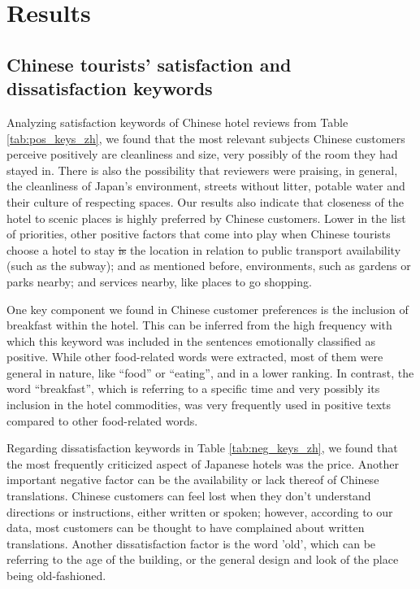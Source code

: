 \documentclass[review]{elsarticle}
\providecommand{\DIFadd}[1]{{\protect\color{blue}\uwave{#1}}} %
\providecommand{\DIFdel}[1]{{\protect\color{red}\sout{#1}}}                      %
\providecommand{\DIFaddbegin}{} %
\providecommand{\DIFaddend}{} %
\providecommand{\DIFdelbegin}{} %
\providecommand{\DIFdelend}{} %
\newcommand{\DIFscaledelfig}{0.5}
\newlength{\DIFdelgraphicswidth} %
\newlength{\DIFdelgraphicsheight} %
\newcommand{\DIFaddincludegraphics}[2][]{{\color{blue}\fbox{\DIFOincludegraphics[#1]{#2}}}} %
\newcommand{\DIFdelincludegraphics}[2][]{%
\sbox{\DIFdelgraphicsbox}{\DIFOincludegraphics[#1]{#2}}%
\settoboxwidth{\DIFdelgraphicswidth}{\DIFdelgraphicsbox} %
\settoboxtotalheight{\DIFdelgraphicsheight}{\DIFdelgraphicsbox} %
\scalebox{\DIFscaledelfig}{%
\parbox[b]{\DIFdelgraphicswidth}{\usebox{\DIFdelgraphicsbox}\\[-\baselineskip] \rule{\DIFdelgraphicswidth}{0em}}\llap{\resizebox{\DIFdelgraphicswidth}{\DIFdelgraphicsheight}{%
\setlength{\unitlength}{\DIFdelgraphicswidth}%
\begin{picture}(1,1)%
\thicklines\linethickness{2pt} %
{\color[rgb]{1,0,0}\put(0,0){\framebox(1,1){}}}%
{\color[rgb]{1,0,0}\put(0,0){\line( 1,1){1}}}%
{\color[rgb]{1,0,0}\put(0,1){\line(1,-1){1}}}%
\end{picture}%
}\hspace*{3pt}}} %
} %
\DeclareRobustCommand{\DIFaddbegin}{\DIFOaddbegin \let\includegraphics\DIFaddincludegraphics} %
\DeclareRobustCommand{\DIFaddend}{\DIFOaddend \let\includegraphics\DIFOincludegraphics} %
\DeclareRobustCommand{\DIFdelbegin}{\DIFOdelbegin \let\includegraphics\DIFdelincludegraphics} %
\DeclareRobustCommand{\DIFdelend}{\DIFOaddend \let\includegraphics\DIFOincludegraphics} %
\begin{document}
\section{Results}\label{results}

\subsection{Chinese tourists' satisfaction and dissatisfaction keywords}

Analyzing satisfaction keywords of Chinese hotel reviews from Table \ref{tab:pos_keys_zh}, we found that the most relevant subjects Chinese customers perceive positively are cleanliness and size, very possibly of the room they had stayed in. There is also the possibility that reviewers were praising, in general, the cleanliness of Japan’s environment, streets without litter, potable water and their culture of respecting spaces. Our results also indicate that \DIFaddbegin \DIFadd{the }\DIFaddend closeness of the hotel to scenic places is highly preferred by Chinese customers. Lower in the list of priorities, other positive factors that come into play when Chinese tourists choose a hotel to stay \DIFdelbegin \DIFdel{is }\DIFdelend \DIFaddbegin \DIFadd{are }\DIFaddend the location in relation to public transport availability (such as the subway); and as mentioned before, environments, such as gardens or parks nearby; and services nearby, like places to go shopping. 

One key component we found in Chinese customer preferences is the inclusion of breakfast within the hotel. This can be inferred from the high frequency with which this keyword was included in the sentences emotionally classified as positive. While other food-related words were extracted, most of them were general in nature, like “food” or “eating”, and in a lower ranking. In contrast, the word “breakfast”, which is referring to a specific time and very possibly its inclusion in the hotel commodities, was very frequently used in positive texts compared to other food-related words. 

Regarding dissatisfaction keywords in Table \ref{tab:neg_keys_zh}, we found that the most frequently criticized aspect of Japanese hotels was the price. Another important negative factor can be the availability or lack thereof of Chinese translations. Chinese customers can feel lost when they don't understand directions or instructions, either written or spoken; however, according to our data, most customers can be thought to have complained about written translations. Another dissatisfaction factor is the word 'old', which can be referring to the age of the building, or the general design and look of the place being old-fashioned.
\end{document}
